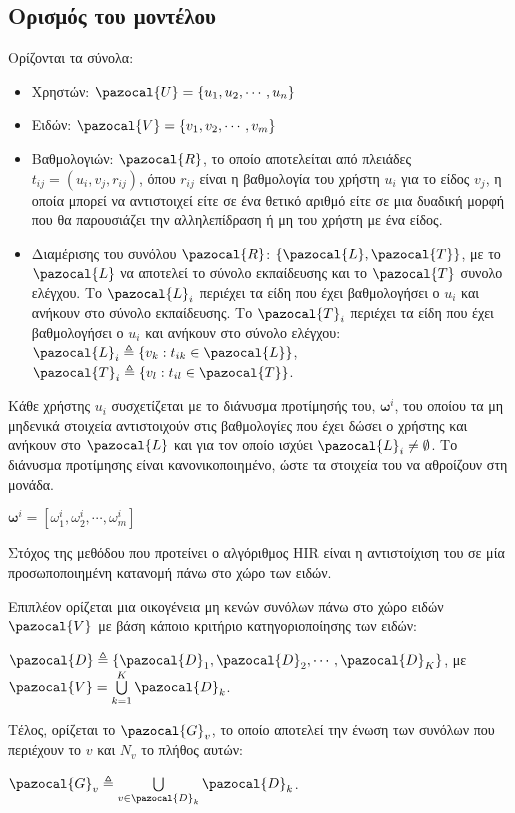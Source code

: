 \subsection{Ορισμός του μοντέλου}
Ορίζονται τα σύνολα:
\begin{itemize}
 \item Χρηστών: $\pazocal{U} = \{u_1, u_2, \cdots, u_n\}$
 \item Ειδών: $\pazocal{V} = \{ v_1, v_2, \cdots, v_m \}$
 \item Βαθμολογιών: $\pazocal{R}$, το οποίο αποτελείται από πλειάδες $t_{ij} = (u_i, v_j, r_{ij})$, όπου $r_{ij}$ είναι η βαθμολογία του χρήστη $u_i$ για το είδος $v_j$, η οποία μπορεί να αντιστοιχεί είτε σε ένα θετικό αριθμό είτε σε μια δυαδική μορφή που θα παρουσιάζει την αλληλεπίδραση ή μη του χρήστη με ένα είδος.
 \item Διαμέρισης του συνόλου $\pazocal{R}$: $\{\pazocal{L}, \pazocal{T}\}$, με το $\pazocal{L}$ να αποτελεί το σύνολο εκπαίδευσης και το $\pazocal{T}$ συνολο ελέγχου. Το $\pazocal{L}_i$ περιέχει τα είδη που έχει βαθμολογήσει ο $u_i$ και ανήκουν στο σύνολο εκπαίδευσης. Το $\pazocal{T}_i$ περιέχει τα είδη που έχει βαθμολογήσει ο $u_i$ και ανήκουν στο σύνολο ελέγχου: $\pazocal{L}_i \triangleq \{v_k : t_{ik} \in \pazocal{L} \}$, $\pazocal{T}_i \triangleq \{v_l : t_{il} \in \pazocal{T} \}$.
\end{itemize}\par
Κάθε χρήστης $u_i$ συσχετίζεται με το διάνυσμα προτίμησής του, $\boldsymbol{\omega}^{i}$, του οποίου τα μη μηδενικά στοιχεία αντιστοιχούν στις βαθμολογίες που έχει δώσει ο χρήστης και ανήκουν στο $\pazocal{L}$ και για τον οποίο ισχύει $\pazocal{L}_i \neq \emptyset$. Το διάνυσμα προτίμησης είναι κανονικοποιημένο, ώστε τα στοιχεία του να αθροίζουν στη μονάδα. 
\begin{center}
$\boldsymbol{\omega}^i = [\omega_1^i, \omega_2^i, \cdots, \omega_m^i ]$
\end{center}\par
Στόχος της μεθόδου που προτείνει ο αλγόριθμος {\en HIR} είναι η αντιστοίχιση του σε μία προσωποποιημένη κατανομή πάνω στο χώρο των ειδών.\par
Επιπλέον ορίζεται μια οικογένεια μη κενών συνόλων πάνω στο χώρο ειδών $\pazocal{V}$ με βάση κάποιο κριτήριο κατηγοριοποίησης των ειδών:
\begin{center}
$\pazocal{D} \triangleq \{\pazocal{D}_1, \pazocal{D}_2, \cdots, \pazocal{D}_K\}$, με $\pazocal{V} = \bigcup\limits_{k=1}^{K} \pazocal{D}_k$.
\end{center}
Τέλος, ορίζεται το $\pazocal{G}_v$, το οποίο αποτελεί την ένωση των συνόλων που περιέχουν το $v$ και $N_v$ το πλήθος αυτών:
\begin{center}
$\pazocal{G}_v \triangleq \bigcup\limits_{v \in \pazocal{D}_k} \pazocal{D}_k$.
\end{center}
